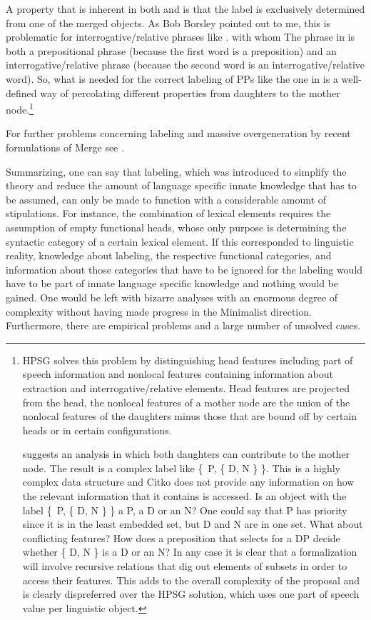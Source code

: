 A property that is inherent in both  and  is that the label
is exclusively determined from one of the merged objects. As Bob Borsley pointed out to me, this is
problematic for interrogative/relative phrases like .
\ea
with whom
\z
The phrase in  is both a prepositional phrase (because the first word is a preposition) and
an interrogative/relative phrase (because the second word is an interrogative/relative word). So, what
is needed for the correct labeling of PPs like the one in  is a well-defined way of
percolating different properties from daughters to the mother node.\footnote{%
HPSG solves this problem by
distinguishing head features including part of speech information and nonlocal features containing
information about extraction and interrogative/relative elements. Head features are projected from
the head, the nonlocal features of a mother node are the union of the nonlocal features of the
daughters minus those that are bound off by certain heads or in certain configurations.

\citet[]{Citko2008a} suggests an analysis in which both daughters can contribute to the
mother node. The result is a complex label like \{~P, \{ D, N \} \}. This is a highly complex data
structure and Citko does not provide any information on how the relevant information that it
contains is accessed. Is an object with the label \{~P, \{ D, N \} \} a P, a D or an N? One could
say that P has priority since it is in the least embedded set, but D and N are in one set. What about
conflicting features? How does a preposition that selects for a DP decide whether \{ D, N \} is a D
or an N? In any case it is clear that a formalization will involve recursive relations that dig out
elements of subsets in order to access their features. This adds to the overall complexity of the
proposal and is clearly dispreferred over the HPSG solution, which uses one part of speech value per linguistic object.
}

For further problems concerning labeling and massive overgeneration by recent formulations of Merge
see .

Summarizing, one can say that labeling, which was introduced to simplify the theory and reduce the
amount of language specific innate knowledge that has to be assumed, can only be made to function with a
considerable amount of stipulations. For instance, the combination of lexical elements requires the
assumption of empty functional heads, whose only purpose is determining the syntactic
category of a certain lexical element. If this corresponded to linguistic reality, knowledge
about labeling, the respective functional categories, and information about those categories that
have to be ignored for the labeling would have to be part of innate language specific knowledge and
nothing would be gained. One would be left with bizarre analyses with an enormous degree of complexity without
having made progress in the Minimalist direction. Furthermore, there are empirical problems and
a large number of unsolved cases.


